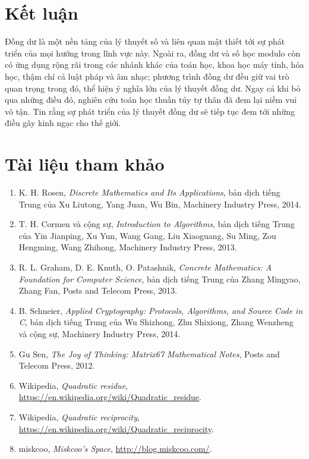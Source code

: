 \documentclass[11pt]{article}
\begin{document}
\section{Kết luận}

Đồng dư là một nền tảng của lý thuyết số và liên quan mật thiết tới sự phát
triển của mọi hướng trong lĩnh vực này. Ngoài ra, đồng dư và số học modulo
còn có ứng dụng rộng rãi trong các nhánh khác của toán học, khoa học máy tính,
hóa học, thậm chí cả luật pháp và âm nhạc; phương trình đồng dư đều giữ vai
trò quan trọng trong đó, thể hiện ý nghĩa lớn của lý thuyết đồng dư. Ngay cả
khi bỏ qua những điều đó, nghiên cứu toán học thuần túy tự thân đã đem lại
niềm vui vô tận. Tin rằng sự phát triển của lý thuyết đồng dư sẽ tiếp tục đem
tới những điều gây kinh ngạc cho thế giới.

\section*{Tài liệu tham khảo}

\begin{enumerate}
  \item K. H. Rosen, \textit{Discrete Mathematics and Its Applications}, bản
  dịch tiếng Trung của Xu Liutong, Yang Juan, Wu Bin, Machinery Industry
  Press, 2014.
  \item T. H. Cormen và cộng sự, \textit{Introduction to Algorithms}, bản dịch
  tiếng Trung của Yin Jianping, Xu Yun, Wang Gang, Liu Xiaoguang, Su Ming, Zou
  Hengming, Wang Zhihong, Machinery Industry Press, 2013.
  \item R. L. Graham, D. E. Knuth, O. Patashnik, \textit{Concrete Mathematics:
  A Foundation for Computer Science}, bản dịch tiếng Trung của Zhang Mingyao,
  Zhang Fan, Posts and Telecom Press, 2013.
  \item B. Schneier, \textit{Applied Cryptography: Protocols, Algorithms, and
  Source Code in C}, bản dịch tiếng Trung của Wu Shizhong, Zhu Shixiong, Zhang
  Wenzheng và cộng sự, Machinery Industry Press, 2014.
  \item Gu Sen, \textit{The Joy of Thinking: Matrix67 Mathematical Notes},
  Posts and Telecom Press, 2012.
  \item Wikipedia, \textit{Quadratic residue},
  \url{https://en.wikipedia.org/wiki/Quadratic_residue}.
  \item Wikipedia, \textit{Quadratic reciprocity},
  \url{https://en.wikipedia.org/wiki/Quadratic_reciprocity}.
  \item miskcoo, \textit{Miskcoo's Space}, \url{http://blog.miskcoo.com/}.
\end{enumerate}
\end{document}
